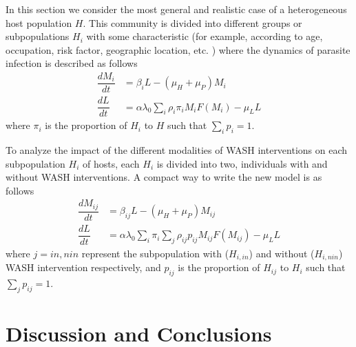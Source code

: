 \documentclass[12pt,a4paper]{article}
\theoremstyle{plain}%
\theoremstyle{definition}
\theoremstyle{remark}
\begin{document}
	In this section we consider the most general and realistic case of a heterogeneous host population $H$.
	This community is divided into different groups or subpopulations $H_i$ with some characteristic (for example, according to age, occupation, risk factor, geographic location, etc. \citep{anderson1992infectious,anderson2014coverage,truscott2014modeling}) where the dynamics of parasite infection is described as follows
	\begin{equation}\label{model2}
	\begin{split}
	\dfrac{dM_i}{dt}&=\beta_i L - (\mu_H+\mu_P) M_i\\%
	\dfrac{dL}{dt}&=\alpha \lambda_0    \sum_i \rho_i \pi_i M_i F(M_i)   - \mu_L L 
	\end{split}
	\end{equation} 
	where $\pi_{i}$ is the proportion of $H_{i}$ to $H$ such that  $\sum _i p_{i} = 1$.
	
	To analyze the impact of the different modalities of WASH interventions on each subpopulation $H_i$ of hosts, each $H_i$ is divided into two, individuals with and without WASH interventions. A compact way to write the new model is as follows
	\begin{equation}\label{model2wash}
	\begin{split}
	\dfrac{dM_{ij}}{dt}&=\beta_{ij} L - (\mu_H+\mu_P) M_{ij}\\%
	\dfrac{dL}{dt}&=\alpha \lambda_0   \sum_i \pi_i  \sum_j \rho_{ij} p_{ij} M_{ij} F(M_{ij}) - \mu_L L 
	\end{split}
	\end{equation} 
	where $j = in, nin$ represent the subpopulation with ($H _{i,in}$) and without ($H_{i,nin}$) WASH intervention respectively, and $p_{ij}$ is the proportion of $H_{ij}$ to $H_i$ such that  $\sum _j p_{ij} = 1$.
	
	
	
	
	
	
	
	
	
	
	
	
	\section{Discussion and Conclusions}
	
\end{document}
